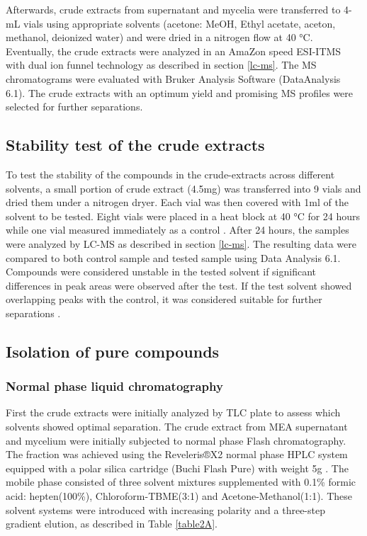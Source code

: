 Afterwards, crude extracts from supernatant and mycelia were transferred to 4-mL vials using appropriate solvents (acetone: MeOH, Ethyl acetate, aceton, methanol, deionized water) and were dried in a nitrogen flow at 40 °C. Eventually, the crude extracts were analyzed in an AmaZon speed ESI-ITMS with dual ion funnel technology as described in section \ref{lc-ms}. The MS chromatograms were evaluated with Bruker Analysis Software (DataAnalysis 6.1). The crude extracts with an optimum yield and promising MS profiles were selected for further separations.

\subsection{Stability test of the crude extracts}
To test the stability of the compounds in the crude-extracts across different solvents, a small portion of crude extract (4.5mg) was transferred into 9 vials and dried them under a nitrogen dryer. Each vial was then covered with 1ml of the solvent to be tested. Eight vials were placed in a heat block at 40 °C for 24 hours while one vial measured immediately as a control \cite{Harms2021} . After 24 hours, the samples were analyzed by LC-MS as described in section \ref{lc-ms}. The resulting data were compared to both control sample and tested sample using Data Analysis 6.1. Compounds were considered unstable in the tested solvent if significant differences in peak areas were observed after the test. If the test solvent showed overlapping peaks with the control, it was considered suitable for further separations \cite{Harms2021}.



\subsection{Isolation of pure compounds}
\subsubsection{Normal phase liquid chromatography}
First the crude extracts were initially analyzed by TLC plate to assess which solvents showed optimal separation. The crude extract from MEA supernatant and mycelium were initially subjected to normal phase Flash chromatography. The fraction was achieved using the Reveleris®X2 normal phase HPLC system equipped with a polar silica cartridge (Buchi Flash Pure) with weight 5g \cite{Rita2023}. The mobile phase  consisted of three solvent mixtures supplemented with 0.1\% formic acid: hepten(100\%), Chloroform-TBME(3:1) and Acetone-Methanol(1:1). These solvent systems were introduced with increasing polarity and a three-step gradient elution, as described in Table \ref{table2A}.\\


